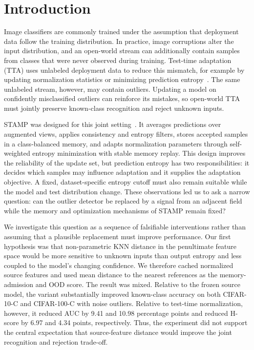 \section{Introduction}

Image classifiers are commonly trained under the assumption that deployment
data follow the training distribution. In practice, image corruptions alter
the input distribution, and an open-world stream can additionally contain
samples from classes that were never observed during training. Test-time
adaptation (TTA) uses unlabeled deployment data to reduce this mismatch, for
example by updating normalization statistics or minimizing prediction
entropy~\cite{schneider2020corruptions,wang2021tent}. The same unlabeled stream,
however, may contain outliers. Updating a model on confidently misclassified
outliers can reinforce its mistakes, so open-world TTA must jointly preserve
known-class recognition and reject unknown inputs.

STAMP was designed for this joint setting~\cite{yu2024stamp}. It averages
predictions over augmented views, applies consistency and entropy filters,
stores accepted samples in a class-balanced memory, and adapts normalization
parameters through self-weighted entropy minimization with stable memory
replay. This design improves the reliability of the update set, but prediction
entropy has two responsibilities: it decides which samples may influence
adaptation and it supplies the adaptation objective. A fixed, dataset-specific
entropy cutoff must also remain suitable while the model and test distribution
change. These observations led us to ask a narrow question: can the outlier
detector be replaced by a signal from an adjacent field while the memory and
optimization mechanisms of STAMP remain fixed?

We investigate this question as a sequence of falsifiable interventions rather
than assuming that a plausible replacement must improve performance. Our first
hypothesis was that non-parametric KNN distance in the penultimate feature space
would be more sensitive to unknown inputs than output entropy and less coupled
to the model's changing confidence. We therefore cached normalized source
features and used mean distance to the nearest references as the memory-admission
and OOD score. The result was mixed. Relative to the frozen source model, the
variant substantially improved known-class accuracy on both CIFAR-10-C and
CIFAR-100-C with noise outliers. Relative to test-time normalization, however,
it reduced AUC by 9.41 and 10.98 percentage points and reduced H-score by 6.97
and 4.34 points, respectively. Thus, the experiment did not support the central
expectation that source-feature distance would improve the joint recognition
and rejection trade-off.

